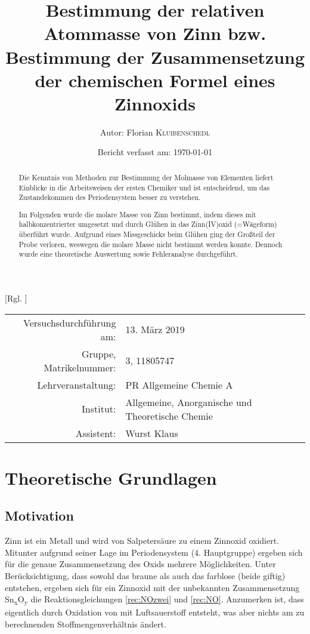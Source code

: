 \documentclass{article}
\title{Bestimmung der relativen Atommasse von Zinn bzw. Bestimmung der Zusammensetzung der chemischen Formel eines Zinnoxids \cite{Versuchsvorschrift}} %
\author{Autor: Florian \textsc{Kluibenschedl}} %
\date{Bericht verfasst am: \today} %
\begin{document}
  [Rgl. ]{}{}
  
  \maketitle %
  
  \begin{center}
    \begin{tabular}{r p{4cm}}
      Versuchsdurchführung am: & 13. März 2019\\ %
      Gruppe, Matrikelnummer: & 3, 11805747 \\
      Lehrveranstaltung: & PR Allgemeine Chemie A \\
      Institut: & Allgemeine, Anorganische und Theoretische Chemie \\
      Assistent: & Wurst Klaus %
    \end{tabular}
  \end{center}


  \begin{abstract}
    Die Kenntnis von Methoden zur Bestimmung der Molmasse von Elementen liefert Einblicke in die Arbeitsweisen der ersten Chemiker und ist entscheidend, um das Zustandekommen des Periodensystem besser zu verstehen. 
    
    Im Folgenden wurde die molare Masse von Zinn bestimmt, indem dieses mit halbkonzentrierter  umgesetzt und durch Glühen in das Zinn(IV)oxid (=Wägeform) überführt wurde. Aufgrund eines Missgeschicks beim Glühen ging der Großteil der Probe verloren, weswegen die molare Masse nicht bestimmt werden konnte. Dennoch wurde eine theoretische Auswertung sowie Fehleranalyse durchgeführt.
  \end{abstract}
  
  \pagebreak
  
  \section{Theoretische Grundlagen}
  
    \subsection{Motivation} \label{sec:Motivation}
      Zinn ist ein Metall und wird von Salpetersäure zu einem Zinnoxid oxidiert. Mitunter aufgrund seiner Lage im Periodensystem (4. Hauptgruppe) ergeben sich für die genaue Zusammensetzung des Oxids mehrere Möglichkeiten. Unter Berücksichtigung, dass sowohl das braune  als auch das farblose  (beide giftig) entstehen, ergeben sich für ein Zinnoxid mit der unbekannten Zusammensetzung Sn\textsubscript{x}O\textsubscript{y} die Reaktionsgleichungen \ref{rec:NOzwei} und \ref{rec:NO}. Anzumerken ist, dass  eigentlich durch Oxidation von  mit Luftsauerstoff entsteht, was aber nichts am zu berechnenden Stoffmengenverhältnis ändert.
\end{document}
